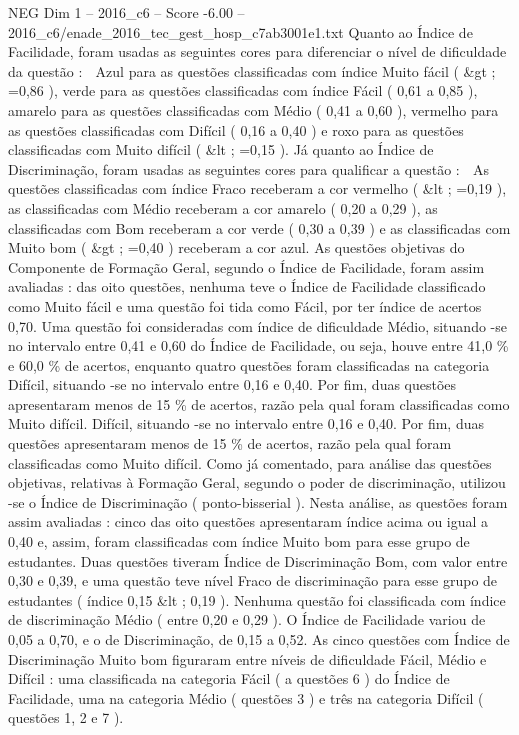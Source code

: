 \begin{textsample}{NEG Dim 1 – 2016\_c6 – Score -6.00 – 2016\_c6/enade\_2016\_tec\_gest\_hosp\_c7ab3001e1.txt}
Quanto ao Índice de Facilidade, foram usadas as seguintes cores para diferenciar o nível de dificuldade da questão :  Azul para as questões classificadas com índice Muito fácil ( \&gt ; =0,86 ), verde para as questões classificadas com índice Fácil ( 0,61 a 0,85 ), amarelo para as questões classificadas com Médio ( 0,41 a 0,60 ), vermelho para as questões classificadas com Difícil ( 0,16 a 0,40 ) e roxo para as questões classificadas com Muito difícil ( \&lt ; =0,15 ).
Já quanto ao Índice de Discriminação, foram usadas as seguintes cores para qualificar a questão :  As questões classificadas com índice Fraco receberam a cor vermelho ( \&lt ; =0,19 ), as classificadas com Médio receberam a cor amarelo ( 0,20 a 0,29 ), as classificadas com Bom receberam a cor verde ( 0,30 a 0,39 ) e as classificadas com Muito bom ( \&gt ; =0,40 ) receberam a cor azul.
As questões objetivas do Componente de Formação Geral, segundo o Índice de Facilidade, foram assim avaliadas : das oito questões, nenhuma teve o Índice de Facilidade classificado como Muito fácil e uma questão foi tida como Fácil, por ter índice de acertos 0,70.
Uma questão foi consideradas com índice de dificuldade Médio, situando -se no intervalo entre 0,41 e 0,60 do Índice de Facilidade, ou seja, houve entre 41,0 \% e 60,0 \% de acertos, enquanto quatro questões foram classificadas na categoria Difícil, situando -se no intervalo entre 0,16 e 0,40.
Por fim, duas questões apresentaram menos de 15 \% de acertos, razão pela qual foram classificadas como Muito difícil.
Difícil, situando -se no intervalo entre 0,16 e 0,40.
Por fim, duas questões apresentaram menos de 15 \% de acertos, razão pela qual foram classificadas como Muito difícil.
Como já comentado, para análise das questões objetivas, relativas à Formação Geral, segundo o poder de discriminação, utilizou -se o Índice de Discriminação ( ponto-bisserial ).
Nesta análise, as questões foram assim avaliadas : cinco das oito questões apresentaram índice acima ou igual a 0,40 e, assim, foram classificadas com índice Muito bom para esse grupo de estudantes.
Duas questões tiveram Índice de Discriminação Bom, com valor entre 0,30 e 0,39, e uma questão teve nível Fraco de discriminação para esse grupo de estudantes ( índice 0,15 \&lt ; 0,19 ).
Nenhuma questão foi classificada com índice de discriminação Médio ( entre 0,20 e 0,29 ).
O Índice de Facilidade variou de 0,05 a 0,70, e o de Discriminação, de 0,15 a 0,52.
As cinco questões com Índice de Discriminação Muito bom figuraram entre níveis de dificuldade Fácil, Médio e Difícil : uma classificada na categoria Fácil ( a questões 6 ) do Índice de Facilidade, uma na categoria Médio ( questões 3 ) e três na categoria Difícil ( questões 1, 2 e 7 ).

\end{textsample}

